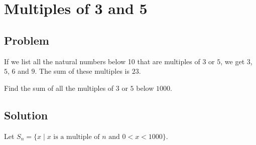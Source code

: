 \section{Multiples of 3 and 5}


\subsection{Problem}

If we list all the natural numbers below 10 that are multiples of \( 3 \) or \(
5 \), we get \( 3 \), \( 5 \), \( 6 \) and \( 9 \). The sum of these multiples
is \( 23 \).

Find the sum of all the multiples of \( 3 \) or \( 5 \) below \( 1000 \).


\subsection{Solution}

Let \( S_n = \{ x \mid x \text{ is a multiple of } n \text{ and } 0 < x
< 1000 \} \).


